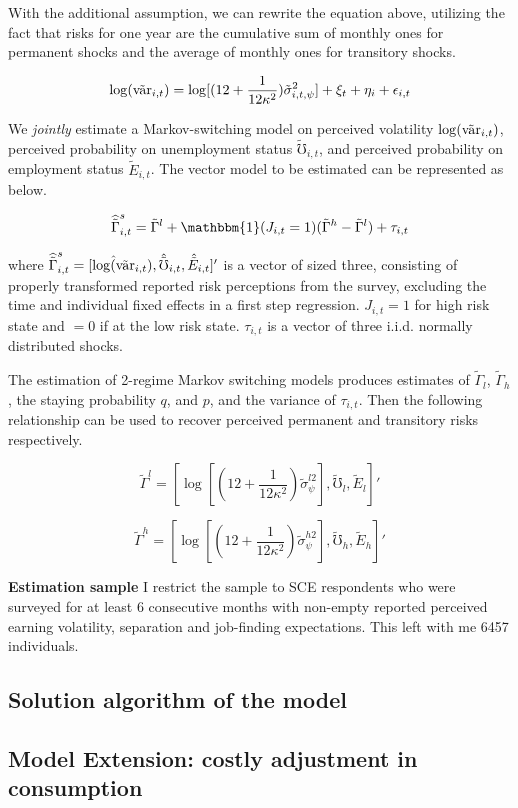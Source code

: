 With the additional assumption, we can rewrite the equation above, utilizing the fact that risks for one year are the cumulative sum of monthly ones for permanent shocks and the average of monthly ones for transitory shocks.

$$\log(\tilde {\text{var}}_{i,t})= \log[(12+\frac{1}{12\kappa^2})\tilde \sigma^2_{i,t,\psi}] + \xi_{t}+\eta_{i}+ \epsilon_{i,t}$$

We \textit{jointly} estimate a Markov-switching model on perceived volatility $\log(\tilde {\text{var}}_{i,t})$, perceived probability on unemployment status $\tilde \mho_{i,t}$, and perceived probability on employment status $\tilde E_{i,t}$. The vector model to be estimated can be represented as below.

$$\widehat{\tilde{\Gamma}}^s_{i,t} = \tilde \Gamma^l + \mathbbm{1}(J_{i,t}=1)(\tilde \Gamma^h-\tilde \Gamma^l) +\tau_{i,t}$$

where $\widehat{\tilde{\Gamma}}^s_{i,t}= [\hat{\log(\tilde{\text{var}}}_{i,t}),\hat{\tilde \mho}_{i,t},\hat{\tilde E}_{i,t}]'$ is a vector of sized three, consisting of properly transformed reported risk perceptions from the survey, excluding the time and individual fixed effects in a first step regression. $J_{i,t}=1$ for high risk state and $=0$ if at the low risk state. $\tau_{i,t}$ is a vector of three i.i.d. normally distributed shocks.

The estimation of 2-regime Markov switching models produces estimates of $\tilde \Gamma_l$, $\tilde \Gamma_h$, the staying probability $q$, and $p$, and the variance of $\tau_{i,t}$. Then the following relationship can be used to recover perceived permanent and transitory risks respectively. 

$$\tilde \Gamma^l=[\log[(12+\frac{1}{12\kappa^2})\tilde \sigma^{l2}_{\psi}],\tilde \mho_l,\tilde E_l]'$$

$$\tilde \Gamma^h = [\log[(12+\frac{1}{12\kappa^2})\tilde \sigma^{h2}_{\psi}],\tilde \mho_h,\tilde E_h]'$$

\textbf{Estimation sample} I restrict the sample to SCE respondents who were surveyed for at least 6 consecutive months with non-empty reported perceived earning volatility, separation and job-finding expectations. This left with me 6457 individuals.

\subsection{Solution algorithm of the model} 


\subsection{Model Extension: costly adjustment in consumption}


